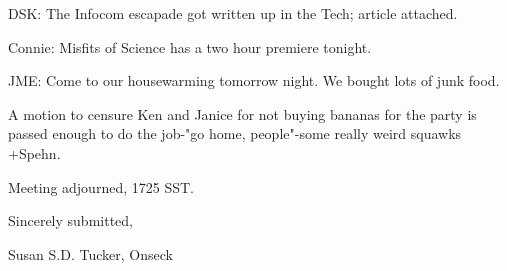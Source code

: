 \documentclass[12pt]{article}
\begin{document}
DSK: The Infocom escapade got written up in the Tech; article attached.

Connie: Misfits of Science has a two hour premiere tonight.

JME: Come to our housewarming tomorrow night. We bought lots of junk food.

A motion to censure Ken and Janice for not buying bananas for the party is passed enough to do the job-"go home, people"-some really weird squawks +Spehn.

\vspace{12pt}

\noindent
Meeting adjourned, 1725 SST.

\vspace{18pt}

\centerline{Sincerely submitted,}
\centerline{Susan S.D. Tucker, Onseck}
\end{document}
